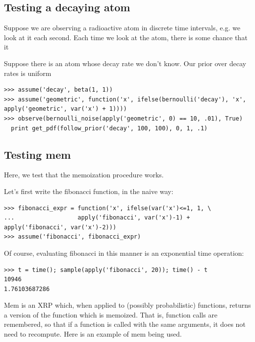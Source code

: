 \documentclass[11pt]{article}
\begin{document}
\subsection{Testing a decaying atom}

Suppose we are observing a radioactive atom in discrete time intervals, e.g. we look at it each second.  Each time we look at the atom, there is some chance that it 

Suppose there is an atom whose decay rate we don't know.  Our prior over decay rates is uniform 

\begin{small}
\begin{verbatim}
>>> assume('decay', beta(1, 1)) 
>>> assume('geometric', function('x', ifelse(bernoulli('decay'), 'x', apply('geometric', var('x') + 1))))
>>> observe(bernoulli_noise(apply('geometric', 0) == 10, .01), True)
  print get_pdf(follow_prior('decay', 100, 100), 0, 1, .1) 

\end{verbatim}
\end{small}

\subsection{Testing mem}

Here, we test that the memoization procedure works.  

\noindent Let's first write the fibonacci function, in the naive way:

\begin{small}
\begin{verbatim}
>>> fibonacci_expr = function('x', ifelse(var('x')<=1, 1, \
...                  apply('fibonacci', var('x')-1) + apply('fibonacci', var('x')-2)))
>>> assume('fibonacci', fibonacci_expr)
\end{verbatim}
\end{small}

\noindent Of course, evaluating fibonacci in this manner is an exponential time operation:

\begin{small}
\begin{verbatim}
>>> t = time(); sample(apply('fibonacci', 20)); time() - t
10946
1.76103687286
\end{verbatim}
\end{small}

\noindent Mem is an XRP which, when applied to (possibly probabilistic) functions, returns a version of the function which is memoized.  That is, function calls are remembered, so that if a function is called with the same arguments, it does not need to recompute.  Here is an example of mem being used.
\end{document}

